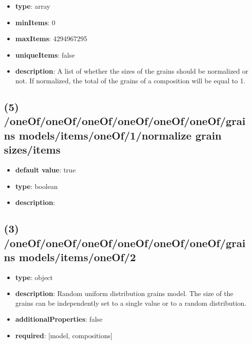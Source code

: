 \begin{itemize}[leftmargin=4em]\item {\bf type}: array
\item {\bf minItems}: 0
\item {\bf maxItems}: 4294967295
\item {\bf uniqueItems}: false
\item {\bf description}: A list of whether the sizes of the grains should be normalized or not. If normalized, the total of the grains of a composition will be equal to 1.
\end{itemize}\subsection{(5) /oneOf/oneOf/oneOf/oneOf/oneOf/oneOf/grains models/items/oneOf/1/normalize grain sizes/items}
\begin{itemize}[leftmargin=5em]\item {\bf default value}: true
\item {\bf type}: boolean
\item {\bf description}: 
\end{itemize}\subsection{(3) /oneOf/oneOf/oneOf/oneOf/oneOf/oneOf/grains models/items/oneOf/2}
\begin{itemize}[leftmargin=3em]\item {\bf type}: object
\item {\bf description}: Random uniform distribution grains model. The size of the grains can be independently set to a single value or to a random distribution.
\item {\bf additionalProperties}: false
\item {\bf required}: [model, compositions]\end{itemize}
